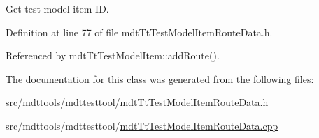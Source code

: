 Get test model item I\-D. 



Definition at line 77 of file mdt\-Tt\-Test\-Model\-Item\-Route\-Data.\-h.



Referenced by mdt\-Tt\-Test\-Model\-Item\-::add\-Route().



The documentation for this class was generated from the following files\-:\begin{DoxyCompactItemize}
\item 
src/mdttools/mdttesttool/\hyperlink{mdt_tt_test_model_item_route_data_8h}{mdt\-Tt\-Test\-Model\-Item\-Route\-Data.\-h}\item 
src/mdttools/mdttesttool/\hyperlink{mdt_tt_test_model_item_route_data_8cpp}{mdt\-Tt\-Test\-Model\-Item\-Route\-Data.\-cpp}\end{DoxyCompactItemize}
